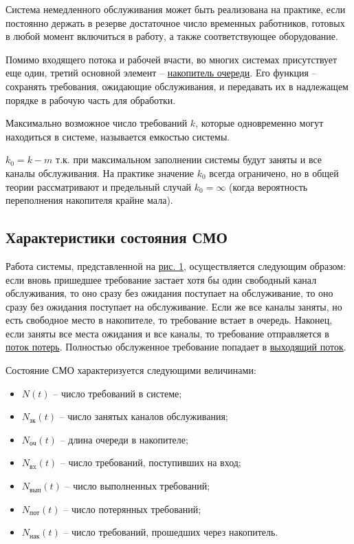 Система немедленного обслуживания может быть реализована на практике, если постоянно держать в резерве достаточное число временных работников, готовых в любой момент включиться в работу, а также соответствующее оборудование.

Помимо входящего потока и рабочей вчасти, во многих системах присутствует еще один, третий основной элемент -- \underline{накопитель очереди}. Его функция -- сохранять требования, ожидающие обслуживания, и передавать их в надлежащем порядке в рабочую часть для обработки.

\begin{definition}
	Максимально возможное число требований $k$, которые одновременно могут находиться в системе, называется {\color{red}емкостью системы}.
\end{definition}

$k_0 = k - m$ т.к. при максимальном заполнении системы будут заняты и все каналы обслуживания. На практике значение $k_0$ всегда ограничено, но в общей теории рассматривают и предельный случай $k_0 = \infty$ (когда вероятность переполнения накопителя крайне мала).

\subsection{Характеристики состояния СМО}

Работа системы, представленной на \hyperref[img:1]{рис. 1}, осуществляется следующим образом: если вновь пришедшее требование застает хотя бы один свободный канал обслуживания, то оно сразу без ожидания поступает на обслуживание, то оно сразу без ожидания поступает на обслуживание. Если же все каналы заняты, но есть свободное место в накопителе, то требование встает в очередь. Наконец, если заняты все места ожидания и все каналы, то требование отправляется в \underline{поток потерь}. Полностью обслуженное требование попадает в \underline{выходящий поток}.

Состояние СМО характеризуется следующими величинами:
\begin{itemize}
	\item $N(t)$ -- число требований в системе;
	\item $N_{\text{зк}} (t)$ -- число занятых каналов обслуживания;
	\item $N_{\text{оч}} (t)$ -- длина очереди в накопителе;
	\item $N_{\text{вx}} (t)$ -- число требований, поступивших на вход;
	\item $N_{\text{вып}} (t)$ -- число выполненных требований;
	\item $N_{\text{пот}} (t)$ -- число потерянных требований;
	\item $N_{\text{нак}} (t)$ -- число требований, прошедших через накопитель.
\end{itemize}

